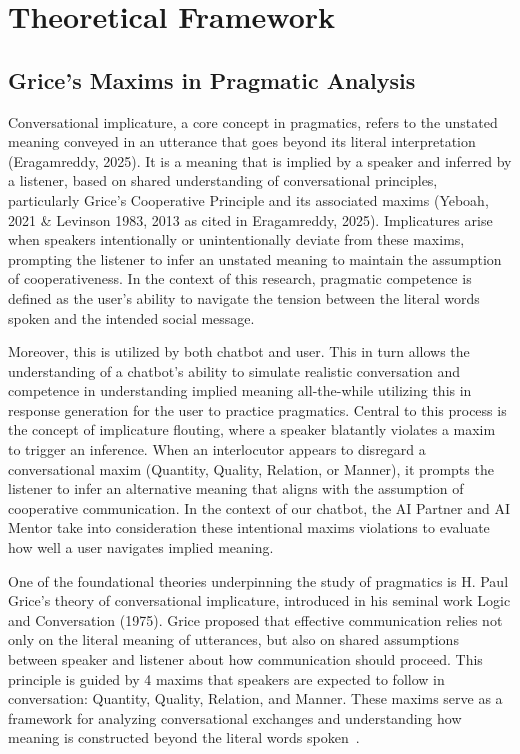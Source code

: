 %
%
%                 
\chapter{Theoretical Framework}
\label{sec:theoframework}

\section{Grice's Maxims in Pragmatic Analysis}

Conversational implicature, a core concept in pragmatics, refers to the unstated meaning conveyed in an utterance that goes beyond its literal interpretation (Eragamreddy, 2025). It is a meaning that is implied by a speaker and inferred by a listener, based on shared understanding of conversational principles, particularly Grice's Cooperative Principle and its associated maxims (Yeboah, 2021 \& Levinson 1983, 2013 as cited in Eragamreddy, 2025). Implicatures arise when speakers intentionally or unintentionally deviate from these maxims, prompting the listener to infer an unstated meaning to maintain the assumption of cooperativeness. In the context of this research, pragmatic competence is defined as the user's ability to navigate the tension between the literal words spoken and the intended social message.

Moreover, this is utilized by both chatbot and user. This in turn allows the understanding of a chatbot's ability to simulate realistic conversation and competence in understanding implied meaning all-the-while utilizing this in response generation for the user to practice pragmatics. Central to this process is the concept of implicature flouting, where a speaker blatantly violates a maxim to trigger an inference. When an interlocutor appears to disregard a conversational maxim (Quantity, Quality, Relation, or Manner), it prompts the listener to infer an alternative meaning that aligns with the assumption of cooperative communication. In the context of our chatbot, the AI Partner and AI Mentor take into consideration these intentional maxims violations to evaluate how well a user navigates implied meaning.

One of the foundational theories underpinning the study of pragmatics is H. Paul Grice's theory of conversational implicature, introduced in his seminal work Logic and Conversation (1975). Grice proposed that effective communication relies not only on the literal meaning of utterances, but also on shared assumptions between speaker and listener about how communication should proceed. This principle is guided by 4 maxims that speakers are expected to follow in conversation: Quantity, Quality, Relation, and Manner. These maxims serve as a framework for analyzing conversational exchanges and understanding how meaning is constructed beyond the literal words spoken~\cite{zheng_grice_2021}.

